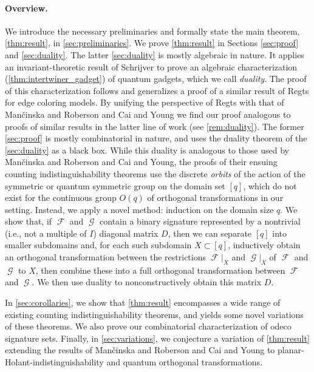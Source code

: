 \documentclass{theoretics}
\DeclareMathOperator{\fc}{\mathcal{F}}
\DeclareMathOperator{\gc}{\mathcal{G}}
\begin{document}
\paragraph{Overview.}
We introduce the necessary preliminaries and formally state the main theorem, 
\autoref{thm:result}, in 
\autoref{sec:preliminaries}. We prove \autoref{thm:result} in Sections
\ref{sec:proof} and \ref{sec:duality}. The latter \autoref{sec:duality} is mostly algebraic in nature.
It applies an invariant-theoretic result of Schrijver \cite{schrijver_tensor_2008} to prove 
an algebraic characterization (\autoref{thm:intertwiner_gadget}) of quantum gadgets,
which we call \emph{duality}.
The proof of this characterization follows and generalizes a proof of a similar result of 
Regts \cite{regts_rank_2012}
for edge coloring models. By unifying the perspective of Regts with that of
Man\v{c}inska and Roberson and Cai and Young \cite{planar, cai_planar_2023, young2022equality}
we find our proof analogous to proofs of similar results in the latter line of work
(see \autoref{rem:duality}). 
The former \autoref{sec:proof} is mostly combinatorial in nature, and uses the duality theorem of the 
\autoref{sec:duality} as a black box. While this duality is analogous to those used by
Man\v{c}inska and Roberson and Cai and Young, the proofs of their ensuing
counting indistinguishability theorems use the discrete \emph{orbits}
of the action of the symmetric or quantum symmetric group on the domain set 
$[q]$, which do not exist for the continuous group $O(q)$ of orthogonal transformations in
our setting. Instead, we apply a novel method: induction on the domain size $q$. 
We show that, if $\fc$ and $\gc$ contain a binary signature
represented by a nontrivial (i.e., not a multiple of $I$) diagonal matrix $D$, 
then we can separate $[q]$ into smaller subdomains and, for each such subdomain 
$X \subset [q]$, inductively obtain an orthogonal transformation between the restrictions
$\fc|_X$ and $\gc|_X$ of $\fc$ and $\gc$ to $X$,
then combine these into a full orthogonal transformation between $\fc$ and $\gc$. 
We then use duality to nonconstructively obtain this matrix $D$.

In \autoref{sec:corollaries}, we show that \autoref{thm:result} 
encompasses a wide range of existing counting indistinguishability theorems,
and yields some novel variations of these theorems. We also prove our combinatorial characterization of
odeco signature sets.
Finally, in \autoref{sec:variations}, we conjecture a variation of \autoref{thm:result}
extending the results 
of Man\v{c}inska and Roberson \cite{planar} and Cai and Young \cite{cai_planar_2023} 
to planar-Holant-indistinguishability and quantum orthogonal transformations.
\end{document}
